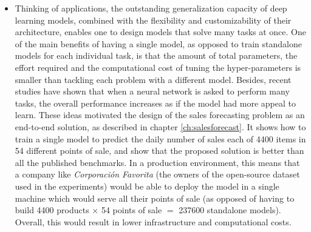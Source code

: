 \begin{itemize}
\item Thinking of applications, the outstanding generalization capacity of deep learning models, combined with the flexibility and customizability of their architecture, enables one to design models that solve many tasks at once. One of the main benefits of having a single model, as opposed to train standalone models for each individual task, is that the amount of total parameters, the effort required and the computational cost of tuning the hyper-parameters is smaller than tackling each problem with a different model. Besides, recent studies have shown that when a neural network is asked to perform many tasks, the overall performance increases \autocite{Jaderberg2016} as if the model had more appeal to learn. These ideas motivated the design of the sales forecasting problem as an end-to-end solution, as described in chapter \ref{ch:salesforecast}. It shows how to train a single model to predict the daily number of sales each of 4400 items in 54 different points of sale, and show that the proposed solution is better than all the published benchmarks. In a production environment, this means that a company like \textit{Corporación Favorita} (the owners of the open-source dataset used in the experiments) would be able to deploy the model in a single machine which would serve all their points of sale (as opposed of having to build 4400 products $\times$ 54 points of sale $=$ 237600 standalone models). Overall, this would result in lower infrastructure and computational costs.


\end{itemize}
